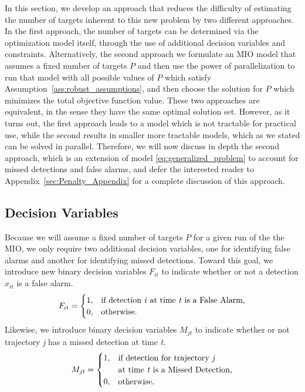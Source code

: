 In this section, we develop an approach that reduces the difficulty of estimating the number of targets inherent to this new problem by two different approaches.  In the first approach, the number of targets can be determined via the optimization model itself, through the use of additional decision variables and constraints. 
Alternatively, the second approach  we formulate an MIO model that assumes a fixed number of targets $P$ and then use the power of parallelization to run that model with all possible values of $P$ which satisfy Assumption~\ref{ass:robust_assumptions}, and then choose the solution for $P$ which minimizes the total objective function value. These two approaches are equivalent, in the sense they have the same optimal solution set.  
 However, as it turns out, the first approach leads to a model which is not tractable for practical use, while the second results in smaller more tractable models, which as we stated can be solved in parallel.
Therefore, we will now discuss in depth the second approach, which is an extension of model \eqref{eq:generalized_problem} to account for missed detections and false alarms, and defer the interested reader to Appendix~\ref{sec:Penalty_Appendix} for a complete discussion of this approach.

\subsection{Decision Variables}
Because we will assume a fixed number of targets $P$ for a given run of the the MIO, we only require two additional decision variables, one for identifying false alarms and another for identifying missed detections. Toward this goal, we introduce new binary decision variables $F_{it}$ to indicate whether or not a detection $x_{it}$ is a false alarm. 
\[F_{it} = 
\begin{cases}
1, & \text{if detection \textit{i} at time \textit{t} is a False Alarm,}\\
0, & \text{otherwise.}
\end{cases}\]
Likewise, we introduce binary decision variables $M_{jt}$ to indicate whether or not trajectory \textit{j} has a missed detection at time \textit{t}.
\[M_{jt} =
\begin{cases}
1, & \text{if detection for trajectory \textit{j}}\\
   &\text{at time \textit{t} is a Missed Detection,}\\
0, & \text{otherwise.}
\end{cases}\]

